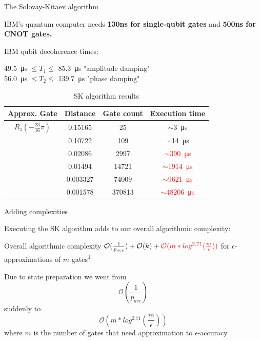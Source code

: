 \documentclass[10pt]{beamer}
\begin{document}
{
\begin{frame}{The Solovay-Kitaev algorithm}

IBM's quantum computer needs \textbf{130ns for single-qubit gates} and \textbf{500ns for CNOT gates.}

IBM qubit decoherence times:

\SI{49.5}{\micro\second} $\leq T_1 \leq$ \SI{85.3}{\micro\second} "amplitude damping"\\
\SI{56.0}{\micro\second} $\leq T_2 \leq$ \SI{139.7}{\micro\second} "phase damping"
\vspace{6mm}


\begin{table}
    \begin{tabular}{c| c |c |c }
      \toprule
      Approx. Gate & Distance & Gate count & Execution time\\
      \midrule
      $R_z(-\frac{23}{16}\pi)$ & 0.15165 & 25 & \textcolor{emerald}{$\sim$\SI{3}{\micro\second}}\\
       & 0.10722 & 109 & \textcolor{emerald}{$\sim$\SI{14}{\micro\second}}\\
       & 0.02086 & 2997 & \textcolor{red}{$\sim$\SI{390}{\micro\second}}\\
       & 0.01494 & 14721 & \textcolor{red}{$\sim$\SI{1914}{\micro\second}}\\
       & 0.003327 & 74009 & \textcolor{red}{$\sim$\SI{9621}{\micro\second}}\\
       & 0.001578 & 370813 & \textcolor{red}{$\sim$\SI{48206}{\micro\second}}\\
      \bottomrule
    \end{tabular}
    \caption{SK algorithm results}
  \end{table}
 

\end{frame}
}

{
\begin{frame}{Adding complexities}

Executing the SK algorithm adds to our overall algorithmic complexity:

	\begin{alertblock}{Overall algorithmic complexity}
	$\mathcal{O}(\frac{1}{p_{acc}})+\mathcal{O}(k)+\textcolor{red}{\mathcal{O}(m*log^{2.71}(\frac{m}{\epsilon}))}$ for $\epsilon$-approximations of $m$ gates\textsuperscript{1}
	\end{alertblock}
	
Due to state preparation we went from
\begin{equation}
\mathcal{O}(\frac{1}{p_{acc}})
\end{equation}
suddenly to 
\begin{equation}
\mathcal{O}(m*log^{2.71}(\frac{m}{\epsilon}))
\end{equation}
where $m$ is the number of gates that need approximation to $\epsilon$-accuracy

\end{frame}
}
\end{document}
